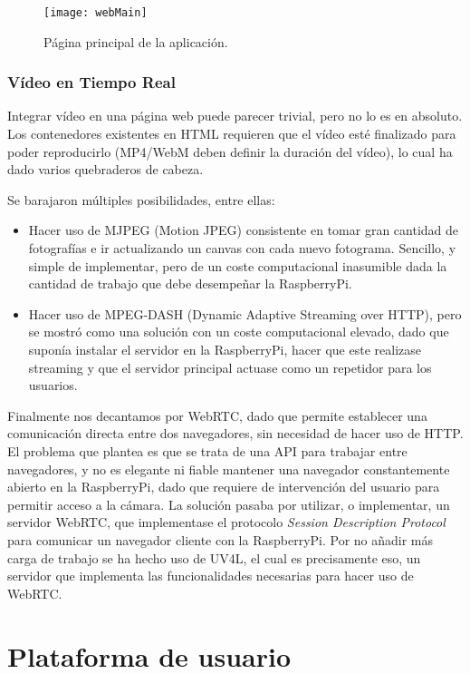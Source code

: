 \begin{figure}
	\centering
	\texttt{[image: webMain]}
	\caption[Web index]{Página principal de la aplicación.}\label{fig:webmain}
\end{figure}

\subsubsection{Vídeo en Tiempo Real}

Integrar vídeo en una página web puede parecer trivial, pero no lo es en absoluto. Los contenedores existentes en HTML requieren que el vídeo esté finalizado para poder reproducirlo (MP4/WebM deben definir la duración del vídeo), lo cual ha dado varios quebraderos de cabeza. 

Se barajaron múltiples posibilidades, entre ellas:
\begin{itemize}
\item Hacer uso de MJPEG (Motion JPEG) consistente en tomar gran cantidad de fotografías e ir actualizando un canvas con cada nuevo fotograma. Sencillo, y simple de implementar, pero de un coste computacional inasumible dada la cantidad de trabajo que debe desempeñar la RaspberryPi.
\item Hacer uso de MPEG-DASH (Dynamic Adaptive Streaming over HTTP), pero se mostró como una solución con un coste computacional elevado, dado que suponía instalar el servidor en la RaspberryPi, hacer que este realizase streaming y que el servidor principal actuase como un repetidor para los usuarios.  
\end{itemize} 

Finalmente nos decantamos por WebRTC, dado que permite establecer una comunicación directa entre dos navegadores, sin necesidad de hacer uso de HTTP. El problema que plantea es que se trata de una API para trabajar entre navegadores, y no es elegante ni fiable mantener una navegador constantemente abierto en la RaspberryPi, dado que requiere de intervención del usuario para permitir acceso a la cámara. 
La solución pasaba por utilizar, o implementar, un servidor WebRTC, que implementase el protocolo \emph{Session Description Protocol} para comunicar un navegador cliente con la RaspberryPi. Por no añadir más carga de trabajo se ha hecho uso de UV4L, el cual es precisamente eso, un servidor que implementa las funcionalidades necesarias para hacer uso de WebRTC.

\section{Plataforma de usuario}

